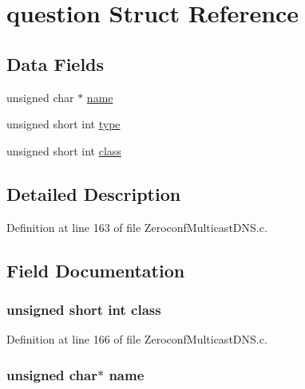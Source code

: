 \hypertarget{structquestion}{}\section{question Struct Reference}
\label{structquestion}
\subsection*{Data Fields}
\begin{DoxyCompactItemize}
\item 
unsigned char $\ast$ \hyperlink{structquestion_a95c1e48f64cb59ba1a4f9814d816be39}{name}
\item 
unsigned short int \hyperlink{structquestion_ae012f1e07e75a1182514bffdefaca17a}{type}
\item 
unsigned short int \hyperlink{structquestion_ab8af177772f70ef82ad57ae02922d8cc}{class}
\end{DoxyCompactItemize}


\subsection{Detailed Description}


Definition at line 163 of file Zeroconf\+Multicast\+D\+N\+S.\+c.



\subsection{Field Documentation}
\hypertarget{structquestion_ab8af177772f70ef82ad57ae02922d8cc}{}
\subsubsection[{class}]{\setlength{\rightskip}{0pt plus 5cm}unsigned short int class}\label{structquestion_ab8af177772f70ef82ad57ae02922d8cc}


Definition at line 166 of file Zeroconf\+Multicast\+D\+N\+S.\+c.

\hypertarget{structquestion_a95c1e48f64cb59ba1a4f9814d816be39}{}
\subsubsection[{name}]{\setlength{\rightskip}{0pt plus 5cm}unsigned char$\ast$ name}\label{structquestion_a95c1e48f64cb59ba1a4f9814d816be39}


